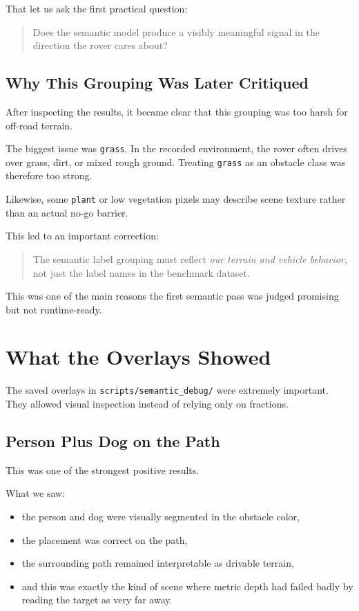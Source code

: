 \documentclass[11pt]{article}
\begin{document}
That let us ask the first practical question:
\begin{quote}
Does the semantic model produce a visibly meaningful signal in the direction the rover cares about?
\end{quote}

\subsection{Why This Grouping Was Later Critiqued}
After inspecting the results, it became clear that this grouping was too harsh for off-road terrain.

The biggest issue was \texttt{grass}. In the recorded environment, the rover often drives over grass, dirt, or mixed rough ground. Treating \texttt{grass} as an obstacle class was therefore too strong.

Likewise, some \texttt{plant} or low vegetation pixels may describe scene texture rather than an actual no-go barrier.

This led to an important correction:
\begin{quote}
The semantic label grouping must reflect \emph{our terrain and vehicle behavior}, not just the label names in the benchmark dataset.
\end{quote}

This was one of the main reasons the first semantic pass was judged promising but not runtime-ready.

\section{What the Overlays Showed}
The saved overlays in \texttt{scripts/semantic\_debug/} were extremely important. They allowed visual inspection instead of relying only on fractions.

\subsection{Person Plus Dog on the Path}
This was one of the strongest positive results.

What we saw:
\begin{itemize}[leftmargin=*]
\item the person and dog were visually segmented in the obstacle color,
\item the placement was correct on the path,
\item the surrounding path remained interpretable as drivable terrain,
\item and this was exactly the kind of scene where metric depth had failed badly by reading the target as very far away.
\end{itemize}
\end{document}
